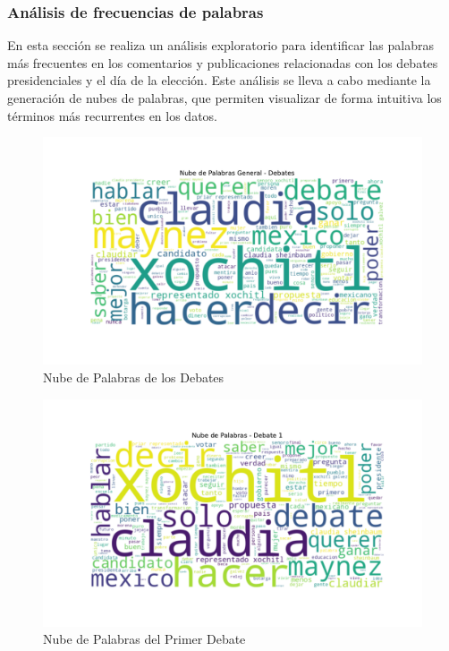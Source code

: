 \documentclass[10pt, a4paper]{article}
\begin{document}
	
	\subsubsection{Análisis de frecuencias de palabras}
	
	En esta sección se realiza un análisis exploratorio para identificar las palabras más frecuentes en los comentarios y publicaciones relacionadas con los debates presidenciales y el día de la elección. Este análisis se lleva a cabo mediante la generación de nubes de palabras, que permiten visualizar de forma intuitiva los términos más recurrentes en los datos.
	
	\vspace{-4mm}
	\begin{figure}[h!]
		\centering
		\includegraphics[width=1\textwidth]{nube_palabras_general.pdf} %
		\vspace{-22mm}
		\caption{Nube de Palabras de los Debates}
		\label{fig:nubeGralDebates} %
	\end{figure}
	
	
	\vspace{-7mm}
	\begin{figure}[h!]
		\centering
		\includegraphics[width=1\textwidth]{nube_palabras_debate_1.pdf} %
		\vspace{-22mm}
		\caption{Nube de Palabras del Primer Debate}
		\label{fig:nubeDebate1} %
	\end{figure}
	
\end{document}
